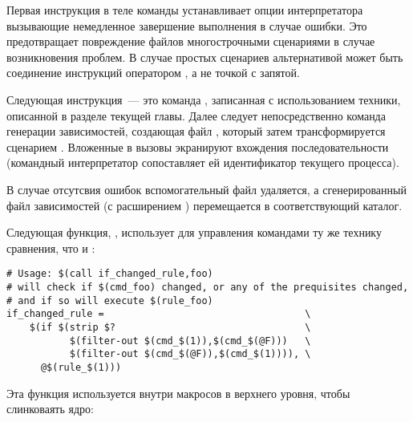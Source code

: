Первая инструкция в теле команды устанавливает опции интерпретатора
вызывающие немедленное завершение выполнения в случае ошибки. Это
предотвращает повреждение файлов многострочными сценариями в случае
возникновения проблем. В случае простых сценариев альтернативой может
быть соединение инструкций оператором \command{\&\&}, а не точкой с
запятой.

Следующая инструкция~--- это команда , записанная с
использованием техники, описанной в разделе
 текущей главы. Далее следует
непосредственно команда генерации зависимостей, создающая файл
, который затем трансформируется сценарием
. Вложенные в  вызовы
 экранируют вхождения последовательности \command{\$\$}
(командный интерпретатор сопоставляет ей идентификатор текущего
процесса).

В случае отсутсвия ошибок вспомогательный файл 
удаляется, а сгенерированный файл зависимостей (с расширением
) перемещается в соответствующий каталог.

Следующая функция, , использует для
управления командами ту же технику сравнения, что и
:

\begin{verbatim}
# Usage: $(call if_changed_rule,foo)
# will check if $(cmd_foo) changed, or any of the prequisites changed,
# and if so will execute $(rule_foo)
if_changed_rule =                                   \
    $(if $(strip $?                                 \
           $(filter-out $(cmd_$(1)),$(cmd_$(@F)))   \
           $(filter-out $(cmd_$(@F)),$(cmd_$(1)))), \
      @$(rule_$(1)))
\end{verbatim}

Эта функция используется внутри макросов в  верхнего
уровня, чтобы слинковаять ядро:

